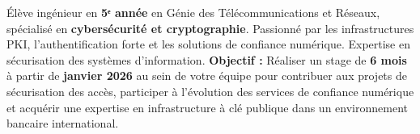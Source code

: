 
\begin{cvparagraph}
    Élève ingénieur en \textbf{5ᵉ année} en Génie des Télécommunications et Réseaux, spécialisé en \textbf{cybersécurité et cryptographie}. Passionné par les infrastructures PKI, l'authentification forte et les solutions de confiance numérique. Expertise en sécurisation des systèmes d'information.
    \newline
    \newline
    \textbf{Objectif :} Réaliser un stage de \textbf{6 mois} à partir de \textbf{janvier 2026} au sein de votre équipe pour contribuer aux projets de sécurisation des accès, participer à l'évolution des services de confiance numérique et acquérir une expertise en infrastructure à clé publique dans un environnement bancaire international.
\end{cvparagraph}
